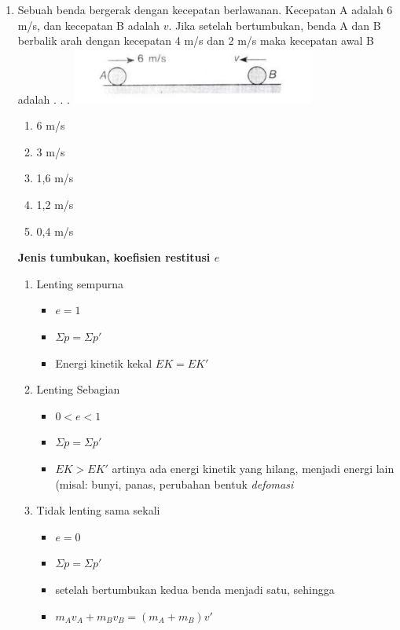 \documentclass[11pt,a4paper]{extarticle}
\newcommand*\daftar[1]{
\begin{itemize}[label=$\bullet$, itemsep=0pt,topsep=0pt,leftmargin=*] #1 
\end{itemize}}
\newcommand{\pilgani}[1]{                            \vspace{-0.3cm}\begin{multicols}{2}
 \begin{enumerate}[label=\Alph*., itemsep=0pt,topsep=0pt,leftmargin=*,align=Center]#1                     \end{enumerate}
 \phantom{ini cuma sapi, wedus, dan ayam}
 \end{multicols}}
\begin{document}
\begin{multicols*}{2}
\begin{enumerate}
\item Sebuah benda bergerak dengan kecepatan berlawanan. Kecepatan A adalah 6 m/s, dan kecepatan B adalah $v$. Jika setelah bertumbukan, benda A dan B berbalik arah dengan kecepatan 4 m/s dan 2 m/s maka kecepatan awal B adalah . . . 
\includegraphics[width=8cm]{pic/mom1}
\pilgani{
        \item 6 m/s
        \item 3 m/s
        \item 1,6 m/s
        \item 1,2 m/s
        \item 0,4 m/s
        }

\vspace{2cm}

\textbf{Jenis tumbukan, koefisien restitusi $e$}
        \begin{enumerate}
\item Lenting sempurna
     \daftar{
        \item $e =1 $
        \item $\Sigma p = \Sigma p' $
        \item Energi kinetik kekal $EK=EK'$
        }

 \item Lenting Sebagian
        \daftar{
        \item $0<e<1$
        \item $\Sigma p = \Sigma p'$
        \item $EK> EK'$ artinya ada energi kinetik yang hilang, menjadi energi lain (misal: bunyi, panas, perubahan bentuk \textit{defomasi}}

 \item Tidak lenting sama sekali
        \daftar{
        \item $e=0$
        \item $\Sigma p = \Sigma p'$
        \item setelah bertumbukan kedua benda menjadi satu, sehingga 
        \item $m_Av_A + m_Bv_B = (m_A + m_B)v'$
        }
        \end{enumerate}


\end{enumerate}



\end{multicols*}
\end{document}

